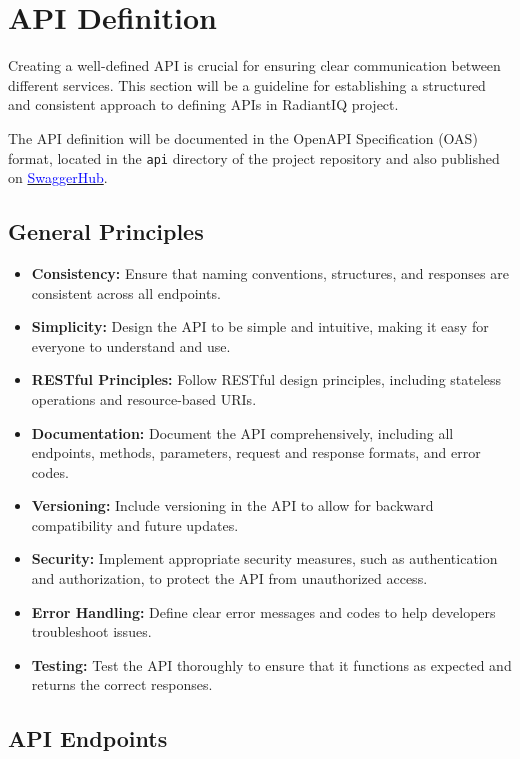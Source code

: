 \section{API Definition} \label{api_definition}

Creating a well-defined API is crucial for ensuring clear communication between different services. This section will be a guideline for establishing a structured and consistent approach to defining APIs in RadiantIQ project.

The API definition will be documented in the OpenAPI Specification (OAS) format, located in the \texttt{api} directory of the project repository and also published on \href{https://app.swaggerhub.com/apis/RadiantIQ/RadiantIQ/1.0.0}{\textcolor{blue}{SwaggerHub}}.

\subsection{General Principles}

\begin{itemize}
    \item \textbf{Consistency:} Ensure that naming conventions, structures, and responses are consistent across all endpoints.
    \item \textbf{Simplicity:} Design the API to be simple and intuitive, making it easy for everyone to understand and use.
    \item \textbf{RESTful Principles:} Follow RESTful design principles, including stateless operations and resource-based URIs.
    \item \textbf{Documentation:} Document the API comprehensively, including all endpoints, methods, parameters, request and response formats, and error codes.
    \item \textbf{Versioning:} Include versioning in the API to allow for backward compatibility and future updates.
    \item \textbf{Security:} Implement appropriate security measures, such as authentication and authorization, to protect the API from unauthorized access.
    \item \textbf{Error Handling:} Define clear error messages and codes to help developers troubleshoot issues.
    \item \textbf{Testing:} Test the API thoroughly to ensure that it functions as expected and returns the correct responses.
\end{itemize}

\subsection{API Endpoints}

